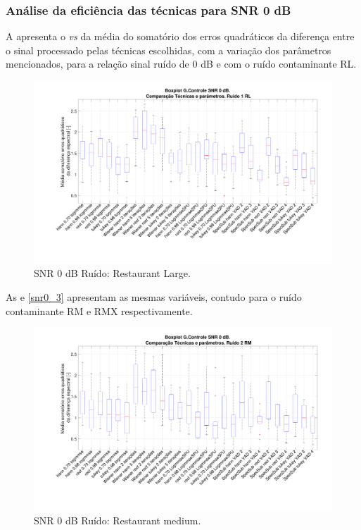 
\subsubsection{Análise da eficiência das técnicas para SNR 0 dB}


A  apresenta o \textit{vs} da média do somatório dos erros quadráticos da diferença entre o sinal processado pelas técnicas escolhidas, com a variação dos parâmetros mencionados, para a relação sinal ruído de 0 dB e com o ruído contaminante RL.

\begin{figure}[H]
\centering
\includegraphics[width=16cm]{Figs/Erro_0_Ruido1.pdf}
\caption{SNR 0 dB Ruído: Restaurant Large.}
\label{snr0_1}
\end{figure}

As  e \ref{snr0_3} apresentam as mesmas variáveis, contudo para o ruído contaminante RM e RMX respectivamente.

\begin{figure}[H]
\centering
\includegraphics[width=16cm]{Figs/Erro_0_Ruido2.pdf} 
\caption{SNR 0 dB Ruído: Restaurant medium.}
\label{snr0_2}
\end{figure}

